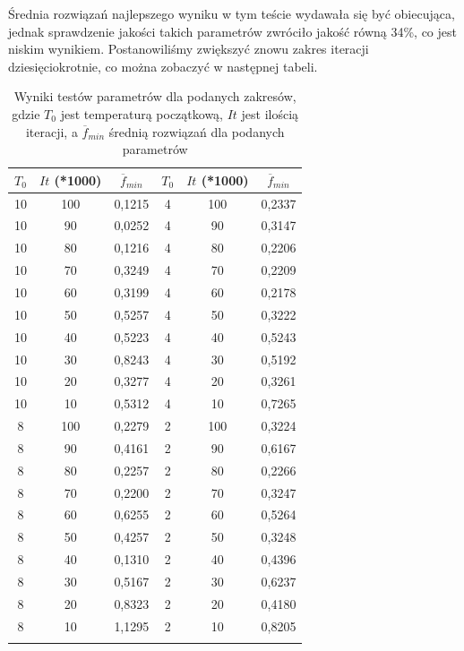 \documentclass[twoside]{projektInzynierskiMS1}
\newcommand{\si}{ś}
\begin{document}
Średnia rozwiązań najlepszego wyniku w tym te\si cie wydawała się być obiecująca, jednak sprawdzenie jako\si ci takich parametrów zwróciło jako\si ć równą 34\%, co jest niskim wynikiem. Postanowili\si my zwiększyć znowu zakres iteracji dziesięciokrotnie, co można zobaczyć w następnej tabeli.

\begin{table}[htbp]\centering
\def\sym#1{\ifmmode^{#1}\else\(^{#1}\)\fi}
\caption{Wyniki testów parametrów dla podanych zakresów, gdzie $T_0$ jest temperaturą początkową, $It$ jest ilo\si cią iteracji, a $\overline{f}_{min}$ \si rednią rozwiązań dla podanych parametrów}
\begin{tabular}{|c|c|c||c|c|c|} 
                  \hline
                   $T_0$
                  & $It$ (*1000)
                  &$\overline{f}_{min}$ 
& $T_0$
 & $It$ (*1000)
 &$\overline{f}_{min}$ \\ \hline
10 & 100 & 0,1215 & 4 & 100 & 0,2337 \\ \hline
10 & 90 & 0,0252 & 4 & 90 & 0,3147 \\ \hline
10 & 80 & 0,1216 & 4 & 80 & 0,2206 \\ \hline
10 & 70 & 0,3249& 4 & 70 & 0,2209 \\ \hline 
10 & 60 & 0,3199 & 4 & 60 & 0,2178 \\ \hline 
10 & 50 & 0,5257 & 4 & 50 & 0,3222 \\ \hline
10 & 40 & 0,5223 & 4 & 40 & 0,5243 \\ \hline 
10 & 30 & 0,8243 & 4 & 30 & 0,5192 \\ \hline
10 & 20 & 0,3277 & 4 & 20 & 0,3261 \\ \hline 
10 & 10 & 0,5312 & 4 & 10 & 0,7265 \\ \Xhline{3\arrayrulewidth}

8 & 100 & 0,2279 & 2 & 100 & 0,3224 \\ \hline 
8 & 90 & 0,4161 & 2 & 90 & 0,6167 \\ \hline 
8 & 80 & 0,2257 & 2 & 80 & 0,2266 \\ \hline 
8 & 70 & 0,2200 & 2 & 70 & 0,3247 \\ \hline 
8 & 60 & 0,6255 & 2 & 60 & 0,5264 \\ \hline 
8 & 50 & 0,4257 & 2 & 50 & 0,3248 \\ \hline 
8 & 40 & 0,1310 & 2 & 40 & 0,4396 \\ \hline
8 & 30 & 0,5167 & 2 & 30 & 0,6237 \\ \hline
8 & 20 & 0,8323 & 2 & 20 & 0,4180 \\ \hline
8 & 10 & 1,1295 & 2 & 10 & 0,8205 \\ \Xhline{3\arrayrulewidth}


\end{tabular}
\end{table}
\end{document}
